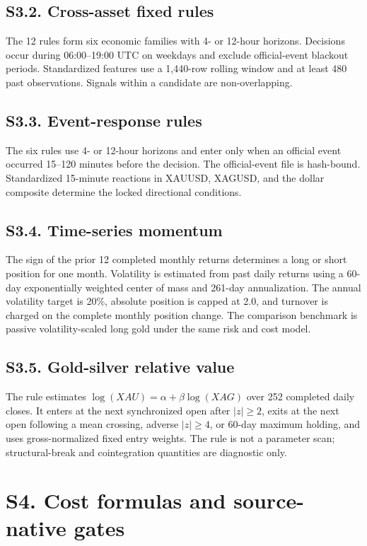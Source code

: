 \documentclass[a4paper,fleqn]{cas-sc}
\begin{document}
\subsection*{S3.2. Cross-asset fixed rules}

The 12 rules form six economic families with 4- or 12-hour horizons. Decisions occur during 06:00--19:00 UTC on weekdays and exclude official-event blackout periods. Standardized features use a 1,440-row rolling window and at least 480 past observations. Signals within a candidate are non-overlapping.

\subsection*{S3.3. Event-response rules}

The six rules use 4- or 12-hour horizons and enter only when an official event occurred 15--120 minutes before the decision. The official-event file is hash-bound. Standardized 15-minute reactions in XAUUSD, XAGUSD, and the dollar composite determine the locked directional conditions.

\subsection*{S3.4. Time-series momentum}

The sign of the prior 12 completed monthly returns determines a long or short position for one month. Volatility is estimated from past daily returns using a 60-day exponentially weighted center of mass and 261-day annualization. The annual volatility target is 20\%, absolute position is capped at 2.0, and turnover is charged on the complete monthly position change. The comparison benchmark is passive volatility-scaled long gold under the same risk and cost model.

\subsection*{S3.5. Gold-silver relative value}

The rule estimates $\log(XAU)=\alpha+\beta\log(XAG)$ over 252 completed daily closes. It enters at the next synchronized open after $|z|\ge2$, exits at the next open following a mean crossing, adverse $|z|\ge4$, or 60-day maximum holding, and uses gross-normalized fixed entry weights. The rule is not a parameter scan; structural-break and cointegration quantities are diagnostic only.

\section*{S4. Cost formulas and source-native gates}
\end{document}
